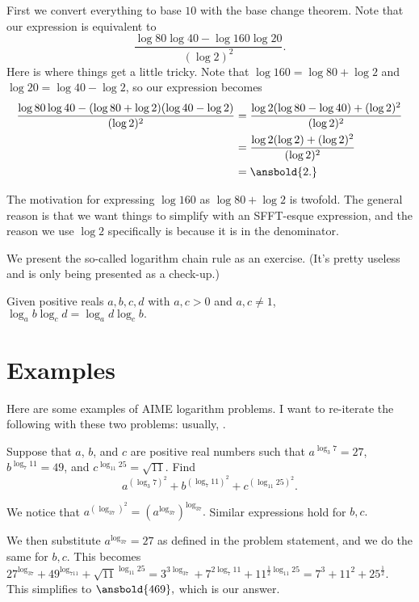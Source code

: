 \begin{sol}
First we convert everything to base $10$ with the base change theorem. Note that our expression is equivalent to
\[\frac{\log 80\log 40 - \log 160\log 20}{(\log 2)^2}.\]
Here is where things get a little tricky. Note that $\log 160 = \log 80 + \log 2$ and $\log 20 = \log 40 - \log 2$, so our expression becomes
\begin{align*}
\frac{\log 80\log 40 - (\log 80+\log 2)(\log 40-\log 2)}{(\log 2)^2}&=\frac{\log 2(\log 80-\log 40)+(\log 2)^2}{(\log 2)^2} \\
&=\frac{\log 2(\log 2)+(\log 2)^2}{(\log 2)^2} \\
&=\ansbold{2.}
\end{align*}
\end{sol}

The motivation for expressing $\log 160$ as $\log 80 + \log 2$ is twofold. The general reason is that we want things to simplify with an SFFT-esque expression, and the reason we use $\log 2$ specifically is because it is in the denominator.

We present the so-called logarithm chain rule as an exercise. (It's pretty useless and is only being presented as a check-up.)

\begin{exer}
Given positive reals $a,b,c,d$ with $a, c > 0$ and $a, c \neq 1$, $\log_{a}b\log_{c}d=\log_{a}d\log_{c}b.$
\end{exer}

\section{Examples}
Here are some examples of AIME logarithm problems. I want to re-iterate the following with these two problems: usually, .

\begin{exam}[AIME II 2009/2]
Suppose that $a$, $b$, and $c$ are positive real numbers such that $a^{\log_3 7} = 27$, $b^{\log_7 11} = 49$, and $c^{\log_{11}25} = \sqrt{11}$. Find
\[a^{(\log_3 7)^2} + b^{(\log_7 11)^2} + c^{(\log_{11} 25)^2}.\]
\end{exam}

\begin{sol} We notice that $a^{(\log_37)^2}=(a^{\log_37})^{\log_37}.$ Similar expressions hold for $b,c.$

We then substitute $a^{\log_37}=27$ as defined in the problem statement, and we do the same for $b,c$. This becomes $27^{\log_37}+49^{\log_711}+\sqrt{11}^{\log_{11}25}=3^{3\log_37}+7^{2\log_7{11}}+11^{\frac{1}{2}\log_{11}25}=7^3+11^2+25^{\frac{1}{2}}.$ This simplifies to $\ansbold{469},$ which is our answer.\end{sol}

